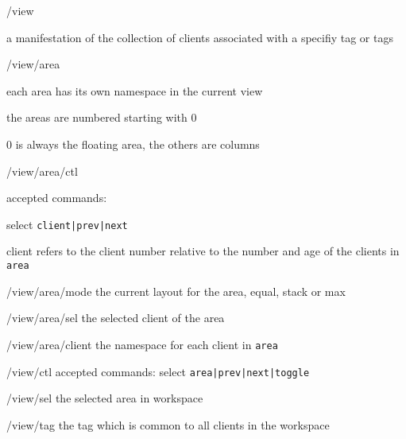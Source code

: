 \documentclass[12pt,a4paper]{article} %
\newenvironment{itemize*}
  {\begin{itemize}
      \setlength{\itemsep}{0pt}
      \setlength{\parskip}{0pt}}
  {\end{itemize}}
\begin{document}
\begin{description}

\item [/view]
\begin{itemize*}
\item a manifestation of the collection of clients associated with a specifiy 
tag or tags
\end{itemize*}

\item [/view/area]
\begin{itemize*}
\item each area has its own namespace in the current view
\item the areas are numbered starting with 0
\item 0 is always the floating area, the others are columns
\end{itemize*}

\item [/view/area/ctl]
\begin{itemize*}
\item accepted commands:
\begin{itemize*}
\item select \verb+client|prev|next+
\item client refers to the client number relative to the number and
age of the clients in \verb+area+
\end{itemize*}
\end{itemize*}

\item [/view/area/mode] the current layout for the area, equal, stack or max
\item [/view/area/sel] the selected client of the area
\item [/view/area/client] the namespace for each client in \verb+area+
\item [/view/ctl] accepted commands: select \verb+area|prev|next|toggle+
\item [/view/sel] the selected area in workspace
\item [/view/tag] the tag which is common to all clients in the workspace

\end{description}
\end{document}

